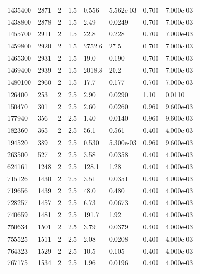 \documentclass[preview]{standalone}
\begin{document}
{{{{{{{{{{{{{{{{{\begin{tabular}{L{1.2cm}C{1.2cm} C{0.3cm}C{0.5cm} C{1.4cm}C{1.4cm} C{1.4cm}C{1.4cm}}
  1435400  &  2871  & 2     & 1.5 &  0.556  & 5.562e-03  & 0.700 &  7.000e-03   \\ 
  1438800  &  2878  & 2     & 1.5 &  2.49  & 0.0249  & 0.700 &  7.000e-03   \\ 
  1455700  &  2911  & 2     & 1.5 &  22.8  & 0.228  & 0.700 &  7.000e-03   \\ 
  1459800  &  2920  & 2     & 1.5 &  2752.6  & 27.5  & 0.700 &  7.000e-03   \\ 
  1465300  &  2931  & 2     & 1.5 &  19.0  & 0.190  & 0.700 &  7.000e-03   \\ 
  1469400  &  2939  & 2     & 1.5 &  2018.8  & 20.2  & 0.700 &  7.000e-03   \\ 
  1480100  &  2960  & 2     & 1.5 &  17.7  & 0.177  & 0.700 &  7.000e-03   \\ 
  126400  &   253  & 2     & 2.5 &  2.90  & 0.0290  & 1.10 &  0.0110   \\ 
  150470  &   301  & 2     & 2.5 &  2.60  & 0.0260  & 0.960 &  9.600e-03   \\ 
  177940  &   356  & 2     & 2.5 &  1.40  & 0.0140  & 0.960 &  9.600e-03   \\ 
  182360  &   365  & 2     & 2.5 &  56.1  & 0.561  & 0.400 &  4.000e-03   \\ 
  194520  &   389  & 2     & 2.5 &  0.530  & 5.300e-03  & 0.960 &  9.600e-03   \\ 
  263500  &   527  & 2     & 2.5 &  3.58  & 0.0358  & 0.400 &  4.000e-03   \\ 
  624161  &  1248  & 2     & 2.5 &  128.1  & 1.28  & 0.400 &  4.000e-03   \\ 
  715126  &  1430  & 2     & 2.5 &  3.51  & 0.0351  & 0.400 &  4.000e-03   \\ 
  719656  &  1439  & 2     & 2.5 &  48.0  & 0.480  & 0.400 &  4.000e-03   \\ 
  728257  &  1457  & 2     & 2.5 &  6.73  & 0.0673  & 0.400 &  4.000e-03   \\ 
  740659  &  1481  & 2     & 2.5 &  191.7  & 1.92  & 0.400 &  4.000e-03   \\ 
  750634  &  1501  & 2     & 2.5 &  3.79  & 0.0379  & 0.400 &  4.000e-03   \\ 
  755525  &  1511  & 2     & 2.5 &  2.08  & 0.0208  & 0.400 &  4.000e-03   \\ 
  764323  &  1529  & 2     & 2.5 &  10.5  & 0.105  & 0.400 &  4.000e-03   \\ 
  767175  &  1534  & 2     & 2.5 &  1.96  & 0.0196  & 0.400 &  4.000e-03   \\ 

\end{tabular}}}}}}}}}}}}}}}}}}
\end{document}
